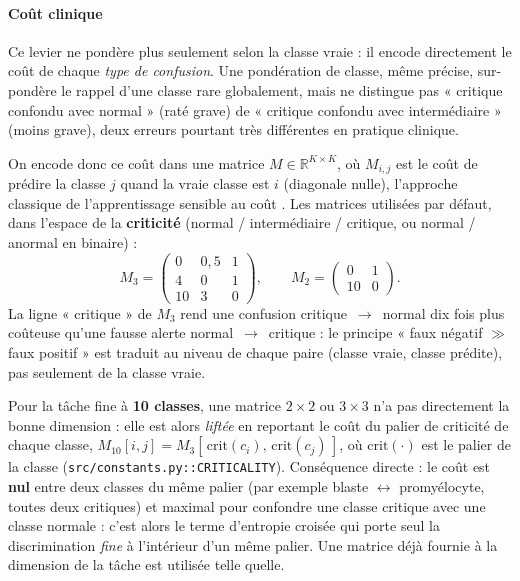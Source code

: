 \paragraph{Coût clinique}
\label{sec:cout-clinique}
Ce levier ne pondère plus seulement selon la classe vraie : il encode directement le coût de chaque \emph{type de confusion}.
Une pondération de classe, même précise, sur-pondère le rappel d’une classe rare globalement, mais ne distingue pas « critique confondu avec normal » (raté grave) de « critique confondu avec intermédiaire » (moins grave), deux erreurs pourtant très différentes en pratique clinique.

On encode donc ce coût dans une matrice $M \in \mathbb{R}^{K \times K}$, où $M_{i,j}$ est le coût de prédire la classe $j$ quand la vraie classe est $i$ (diagonale nulle), l’approche classique de l’apprentissage sensible au coût \parencite{elkan2001costsensitive,kukar1998costsensitive}.
Les matrices utilisées par défaut, dans l’espace de la \textbf{criticité} (normal / intermédiaire / critique, ou normal / anormal en binaire) :
\[
  M_3 = \begin{pmatrix} 0 & 0{,}5 & 1 \\ 4 & 0 & 1 \\ 10 & 3 & 0 \end{pmatrix},
  \qquad
  M_2 = \begin{pmatrix} 0 & 1 \\ 10 & 0 \end{pmatrix}.
\]
La ligne « critique » de $M_3$ rend une confusion critique~$\to$~normal dix fois plus coûteuse qu’une fausse alerte normal~$\to$~critique : le principe « faux négatif $\gg$ faux positif » est traduit au niveau de chaque paire (classe vraie, classe prédite), pas seulement de la classe vraie.

Pour la tâche fine à \textbf{10 classes}, une matrice $2\times2$ ou $3\times3$ n’a pas directement la bonne dimension : elle est alors \emph{liftée} en reportant le coût du palier de criticité de chaque classe, $M_{10}[i,j] = M_{3}[\,\mathrm{crit}(c_i),\,\mathrm{crit}(c_j)\,]$, où $\mathrm{crit}(\cdot)$ est le palier de la classe (\texttt{src/constants.py::CRITICALITY}).
Conséquence directe : le coût est \textbf{nul} entre deux classes du même palier (par exemple blaste $\leftrightarrow$ promyélocyte, toutes deux critiques) et maximal pour confondre une classe critique avec une classe normale : c’est alors le terme d’entropie croisée qui porte seul la discrimination \emph{fine} à l’intérieur d’un même palier.
Une matrice déjà fournie à la dimension de la tâche est utilisée telle quelle.


